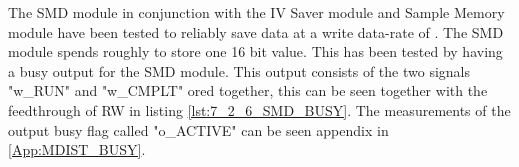 The SMD module in conjunction with the IV Saver module and Sample Memory module have been tested to reliably save data at a write data-rate of . The SMD module spends roughly  to store one 16 bit value. This has been tested by having a busy output for the SMD module. This output consists of the two signals "w\_RUN" and "w\_CMPLT" ored together, this can be seen together with the feedthrough of RW in listing \ref{lst:7_2_6_SMD_BUSY}. The measurements of the output busy flag called "o\_ACTIVE" can be seen appendix in \ref{App:MDIST_BUSY}.

 